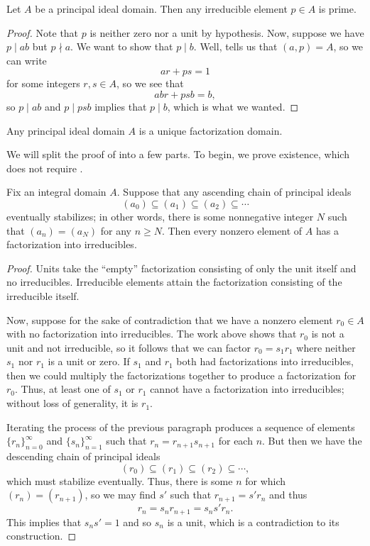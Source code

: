 \documentclass[../notes.tex]{subfiles}
\begin{document}
\begin{proposition} \label{prop:irred-is-prime}
	Let $A$ be a principal ideal domain. Then any irreducible element $p\in A$ is prime.
\end{proposition}
\begin{proof}
	Note that $p$ is neither zero nor a unit by hypothesis. Now, suppose we have $p\mid ab$ but $p\nmid a$. We want to show that $p\mid b$. Well,  tells us that $(a,p)=A$, so we can write
	\[ar+ps=1\]
	for some integers $r,s\in A$, so we see that
	\[abr+psb=b,\]
	so $p\mid ab$ and $p\mid psb$ implies that $p\mid b$, which is what we wanted.
\end{proof}
\begin{theorem} \label{thm:pid-is-ufd}
	Any principal ideal domain $A$ is a unique factorization domain.
\end{theorem}
We will split the proof of  into a few parts. To begin, we prove existence, which does not require .
\begin{lemma} \label{lem:get-exis-factorization}
	Fix an integral domain $A$. Suppose that any ascending chain of principal ideals
	\[(a_0)\subseteq(a_1)\subseteq(a_2)\subseteq\cdots\]
	eventually stabilizes; in other words, there is some nonnegative integer $N$ such that $(a_n)=(a_N)$ for any $n\ge N$. Then every nonzero element of $A$ has a factorization into irreducibles.
\end{lemma}
\begin{proof}
	Units take the ``empty'' factorization consisting of only the unit itself and no irreducibles. Irreducible elements attain the factorization consisting of the irreducible itself.

	Now, suppose for the sake of contradiction that we have a nonzero element $r_0\in A$ with no factorization into irreducibles. The work above shows that $r_0$ is not a unit and not irreducible, so it follows that we can factor $r_0=s_1r_1$ where neither $s_1$ nor $r_1$ is a unit or zero. If $s_1$ and $r_1$ both had factorizations into irreducibles, then we could multiply the factorizations together to produce a factorization for $r_0$. Thus, at least one of $s_1$ or $r_1$ cannot have a factorization into irreducibles; without loss of generality, it is $r_1$.

	Iterating the process of the previous paragraph produces a sequence of elements $\{r_n\}_{n=0}^\infty$ and $\{s_n\}_{n=1}^\infty$ such that $r_n=r_{n+1}s_{n+1}$ for each $n$. But then we have the descending chain of principal ideals
	\[(r_0)\subseteq(r_1)\subseteq(r_2)\subseteq\cdots,\]
	which must stabilize eventually. Thus, there is some $n$ for which $(r_n)=(r_{n+1})$, so we may find $s'$ such that $r_{n+1}=s'r_n$ and thus
	\[r_n=s_nr_{n+1}=s_ns'r_n.\]
	This implies that $s_ns'=1$ and so $s_n$ is a unit, which is a contradiction to its construction.
\end{proof}
\end{document}
